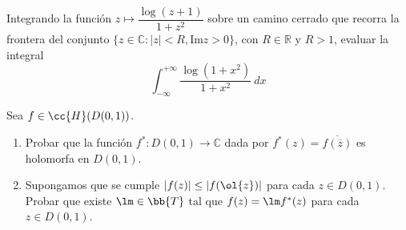 \documentclass[12pt]{article}
\begin{document}
    \begin{ejercicio}[2.5 puntos]
        Integrando la función $z\longmapsto \dfrac{\log(z+1)}{1+z^2}$ sobre un camino cerrado que recorra la frontera del conjunto $\{z\in \mathbb{C} : |z| < R, \text{Im}z > 0\}$, con $R\in \mathbb{R}$ y $R>1$, evaluar la integral
        \begin{equation*}
            \int_{-\infty}^{+\infty} \dfrac{\log(1+x^2)}{1+x^2}~dx 
        \end{equation*}
    \end{ejercicio}

    \begin{ejercicio}[2.5 puntos]
        Sea $f\in \cc{H}(D(0,1))$.
        \begin{enumerate}[label=\alph*)]
            \item Probar que la función $f^\ast:D(0,1)\to \mathbb{C}$ dada por $f^\ast(z) = \overline{f(\overline{z})}$ es holomorfa en $D(0,1)$.
            \item Supongamos que se cumple $|f(z)| \leq |f(\ol{z})|$ para cada $z\in D(0,1)$. Probar que existe $\lm\in \bb{T}$ tal que $f(z)=\lm f^\ast(z)$ para cada $z\in D(0,1)$.
        \end{enumerate}
    \end{ejercicio}
\end{document}
